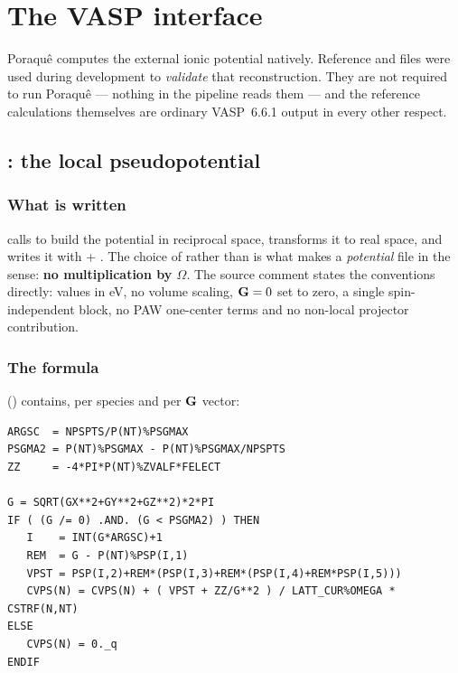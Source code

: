 \chapter{The VASP interface}
\label{ch:vasp}

Poraqu\^e computes the external ionic potential natively. Reference  and  files were used during development to
\emph{validate} that reconstruction. They are not required to run Poraqu\^e ---
nothing in the pipeline reads them --- and the reference calculations
themselves are ordinary VASP~6.6.1 output in every other respect.

\section{\texorpdfstring{}{EXTCAR}: the local pseudopotential}

\subsection{What is written}

 calls  to build the potential in reciprocal space,
transforms it to real space, and writes it with  + .
The choice of  rather than  is what makes 
a \emph{potential} file in the  sense: \textbf{no multiplication by
$\Omega$}. The source comment states the conventions directly: values in eV,
no volume scaling, $\mathbf{G}=0$ set to zero, a single spin-independent block, no PAW
one-center terms and no non-local projector contribution.

\subsection{The formula}

 () contains, per species and per $\mathbf{G}$ vector:

\begin{lstlisting}[style=fortran]
ARGSC  = NPSPTS/P(NT)%PSGMAX
PSGMA2 = P(NT)%PSGMAX - P(NT)%PSGMAX/NPSPTS
ZZ     = -4*PI*P(NT)%ZVALF*FELECT

G = SQRT(GX**2+GY**2+GZ**2)*2*PI
IF ( (G /= 0) .AND. (G < PSGMA2) ) THEN
   I    = INT(G*ARGSC)+1
   REM  = G - P(NT)%PSP(I,1)
   VPST = PSP(I,2)+REM*(PSP(I,3)+REM*(PSP(I,4)+REM*PSP(I,5)))
   CVPS(N) = CVPS(N) + ( VPST + ZZ/G**2 ) / LATT_CUR%OMEGA * CSTRF(N,NT)
ELSE
   CVPS(N) = 0._q
ENDIF
\end{lstlisting}

